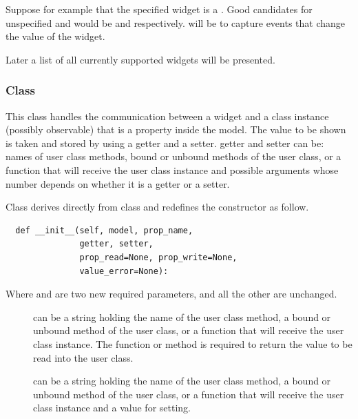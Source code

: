 Suppose for example that the specified widget is a
. Good candidates for unspecified
 and  would be
 and 
respectively.  will be  to
capture events that change the value of the widget.

Later a list of all currently supported widgets will be presented.


\subsubsection{Class }

This class handles the communication between a widget and a class
instance (possibly observable) that is a property inside the
model. The value to be shown is taken and stored by using a getter
and a setter. getter and setter can be: names of user class methods,
bound or unbound methods of the user class, or a function that will
receive the user class instance and possible arguments whose number
depends on whether it is a getter or a setter.

Class  derives directly from class
 and redefines the constructor as follow.

{
\codesize
\begin{verbatim}
  def __init__(self, model, prop_name,
               getter, setter, 
               prop_read=None, prop_write=None,                   
               value_error=None):
\end{verbatim}
}

Where  and  are two new required
parameters, and all the other are unchanged.

\begin{description}
\item [] can be a string holding the name of the
  user class method, a bound or unbound method of the user class, or
  a function that will receive the user class instance. The function
  or method is required to return the value to be read into the user
  class.

\item [] can be a string holding the name of the
  user class method, a bound or unbound method of the user class, or
  a function that will receive the user class instance and a value
  for setting. 
\end{description}



